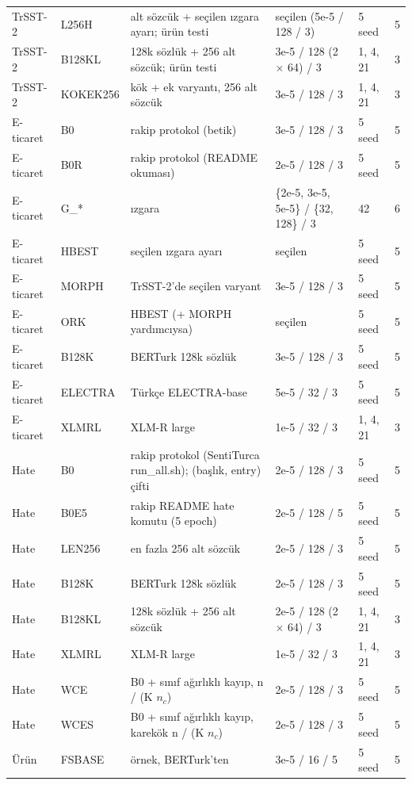 \documentclass[11pt]{article}
\begin{document}
\begin{table}[!htbp]
\begin{tabularx}{\textwidth}{ll>{\raggedright\arraybackslash}Xllr}
TrSST-2 & L256H & 256 alt sözcük + seçilen ızgara ayarı; ürün testi & seçilen (5e-5 / 128 / 3) & 5 seed & \mbox{5} \\
TrSST-2 & B128KL & 128k sözlük + 256 alt sözcük; ürün testi & 3e-5 / 128 (2 $\times$ 64) / 3 & 1, 4, 21 & \mbox{3} \\
TrSST-2 & KOKEK256 & kök + ek varyantı, 256 alt sözcük & 3e-5 / 128 / 3 & 1, 4, 21 & \mbox{3} \\
E-ticaret & B0 & rakip protokol (betik) & 3e-5 / 128 / 3 & 5 seed & \mbox{5} \\
E-ticaret & B0R & rakip protokol (README okuması) & 2e-5 / 128 / 3 & 5 seed & \mbox{5} \\
E-ticaret & G\_* & ızgara & \{2e-5, 3e-5, 5e-5\} / \{32, 128\} / 3 & 42 & \mbox{6} \\
E-ticaret & HBEST & seçilen ızgara ayarı & seçilen & 5 seed & \mbox{5} \\
E-ticaret & MORPH & TrSST-2'de seçilen varyant & 3e-5 / 128 / 3 & 5 seed & \mbox{5} \\
E-ticaret & ORK & HBEST (+ MORPH yardımcıysa) & seçilen & 5 seed & \mbox{5} \\
E-ticaret & B128K & BERTurk 128k sözlük & 3e-5 / 128 / 3 & 5 seed & \mbox{5} \\
E-ticaret & ELECTRA & Türkçe ELECTRA-base & 5e-5 / 32 / 3 & 5 seed & \mbox{5} \\
E-ticaret & XLMRL & XLM-R large & 1e-5 / 32 / 3 & 1, 4, 21 & \mbox{3} \\
Hate & B0 & rakip protokol (SentiTurca run\_all.sh); (başlık, entry) çifti & 2e-5 / 128 / 3 & 5 seed & \mbox{5} \\
Hate & B0E5 & rakip README hate komutu (5 epoch) & 2e-5 / 128 / 5 & 5 seed & \mbox{5} \\
Hate & LEN256 & en fazla 256 alt sözcük & 2e-5 / 128 / 3 & 5 seed & \mbox{5} \\
Hate & B128K & BERTurk 128k sözlük & 2e-5 / 128 / 3 & 5 seed & \mbox{5} \\
Hate & B128KL & 128k sözlük + 256 alt sözcük & 2e-5 / 128 (2 $\times$ 64) / 3 & 1, 4, 21 & \mbox{3} \\
Hate & XLMRL & XLM-R large & 1e-5 / 32 / 3 & 1, 4, 21 & \mbox{3} \\
Hate & WCE & B0 + sınıf ağırlıklı kayıp, n / (K $n_{c}$) & 2e-5 / 128 / 3 & 5 seed & \mbox{5} \\
Hate & WCES & B0 + sınıf ağırlıklı kayıp, karekök n / (K $n_{c}$) & 2e-5 / 128 / 3 & 5 seed & \mbox{5} \\
Ürün & FSBASE & 1.000 örnek, BERTurk'ten & 3e-5 / 16 / 5 & 5 seed & \mbox{5} \\

\end{tabularx}
\end{table}
\end{document}
